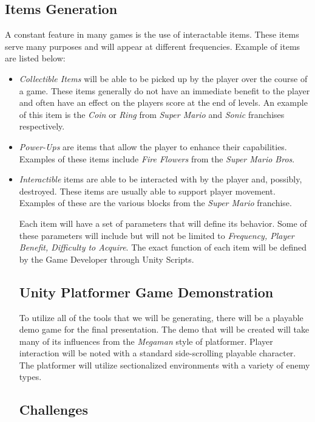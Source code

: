 \documentclass[pdftex,12pt,letter]{article}
\begin{document}
\begin{itemize}
\begin{itemize}
\subsection{Items Generation}
A constant feature in many games is the use of interactable items. These items serve many purposes and will appear at different frequencies. Example of items are listed below:
\begin{itemize}
\item \textit{Collectible Items} will be able to be picked up by the player over the course of a game. These items generally do not have an immediate benefit to the player and often have an effect on the players score at the end of levels. An example of this item is the \textit{Coin} or \textit{Ring} from \textit{Super Mario} and \textit{Sonic} franchises respectively. 

\item \textit{Power-Ups} are items that allow the player to enhance their capabilities. Examples of these items include \textit{Fire Flowers} from the \textit{Super Mario Bros}.

\item \textit{Interactible} items are able to be interacted with by the player and, possibly, destroyed. These items are usually able to support player movement. Examples of these are the various blocks from the \textit{Super Mario} franchise. \\

\endgroup

Each item will have a set of parameters that will define its behavior. Some of these parameters will include but will not be limited to \textit{Frequency, Player Benefit, Difficulty to Acquire}. The exact function of each item will be defined by the Game Developer through Unity Scripts. 
\\

\subsection{Unity Platformer Game Demonstration}
To utilize all of the tools that we will be generating, there will be a playable demo game for the final presentation. The demo that will be created will take many of its influences from the \textit{Megaman} style of platformer.  Player interaction will be noted with a standard side-scrolling playable character. The platformer will utilize sectionalized environments with a variety of enemy types. 


\section{Challenges}

\end{itemize}
\end{itemize}
\end{itemize}
\end{document}
